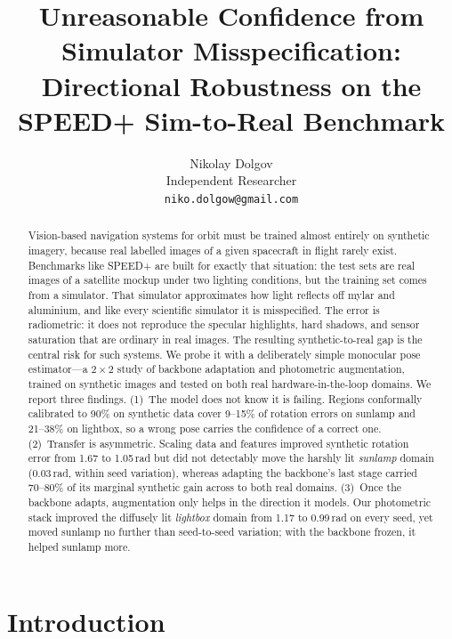 \documentclass{article}
\title{Unreasonable Confidence from Simulator Misspecification: Directional Robustness on the SPEED+ Sim-to-Real Benchmark}
\author{%
  Nikolay Dolgov\\
  Independent Researcher\\
  \texttt{niko.dolgow@gmail.com}
}
\begin{document}
\maketitle

\begin{abstract}
Vision-based navigation systems for orbit must be trained almost entirely on synthetic
imagery, because real labelled images of a given spacecraft in flight rarely exist.
Benchmarks like SPEED+ are built for exactly that situation: the test sets are real
images of a satellite mockup under two lighting conditions, but the training set comes
from a simulator. That simulator approximates how light reflects off mylar and
aluminium, and like every scientific simulator it is misspecified. The error is
radiometric: it does not reproduce the specular highlights, hard shadows, and sensor
saturation that are ordinary in real images. The resulting synthetic-to-real gap is the
central risk for such systems. We probe it with a deliberately simple monocular pose
estimator---a $2{\times}2$ study of backbone adaptation and photometric augmentation,
trained on synthetic images and tested on both real hardware-in-the-loop domains. We
report three findings. (1)~The model does not know it is failing. Regions conformally
calibrated to 90\% on synthetic data cover 9--15\% of rotation errors on sunlamp and
21--38\% on lightbox, so a wrong pose carries the confidence of a correct one.
(2)~Transfer is asymmetric. Scaling data and features improved synthetic rotation error
from 1.67 to 1.05\,rad but did not detectably move the harshly lit \emph{sunlamp}
domain (0.03\,rad, within seed variation), whereas adapting the backbone's last stage carried 70--80\% of its marginal
synthetic gain across to both real domains. (3)~Once the backbone adapts, augmentation
only helps in the direction it models. Our photometric stack improved the diffusely lit
\emph{lightbox} domain from 1.17 to 0.99\,rad on every seed, yet moved sunlamp no
further than seed-to-seed variation; with the backbone frozen, it helped sunlamp more.
\end{abstract}

\section{Introduction}
\label{sec:intro}
\end{document}
